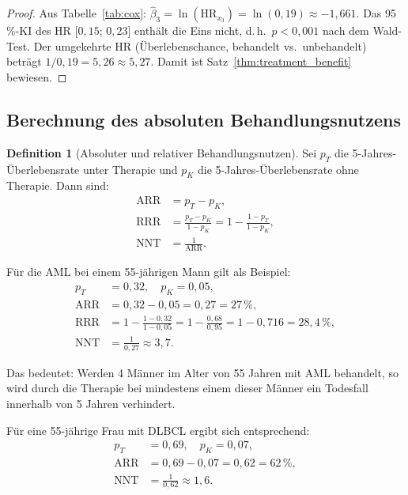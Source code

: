 ﻿\documentclass[12pt,a4paper]{article}
\theoremstyle{definition}
\newtheorem{definition}[theorem]{Definition}
\newcommand{\HR}{\mathrm{HR}}
\begin{document}
\begin{proof}
  Aus Tabelle~\ref{tab:cox}: $\hat{\beta}_3 = \ln(\HR_{x_3}) = \ln(0{,}19)
  \approx -1{,}661$.
  Das 95\,\%-KI des HR [$0{,}15$; $0{,}23$] enthält die Eins nicht, d.\,h.\
  $p < 0{,}001$ nach dem Wald-Test.
  Der umgekehrte HR (Überlebenschance, behandelt vs.\ unbehandelt) beträgt
  $1 / 0{,}19 = 5{,}26 \approx 5{,}27$.
  Damit ist Satz~\ref{thm:treatment_benefit} bewiesen.
\end{proof}

\subsection{Berechnung des absoluten Behandlungsnutzens}

\begin{definition}[Absoluter und relativer Behandlungsnutzen]
  Sei $p_T$ die 5-Jahres-Überle\-bensrate unter Therapie und $p_K$ die
  5-Jahres-Überlebensrate ohne Therapie. Dann sind:
  \begin{align}
    \mathrm{ARR} &= p_T - p_K, \label{eq:arr} \\
    \mathrm{RRR} &= \frac{p_T - p_K}{1 - p_K} = 1 - \frac{1 - p_T}{1 - p_K},
    \label{eq:rrr} \\
    \mathrm{NNT} &= \frac{1}{\mathrm{ARR}}.
    \label{eq:nnt}
  \end{align}
\end{definition}

Für die AML bei einem 55-jährigen Mann gilt als Beispiel:
\begin{align}
  p_T &= 0{,}32, \quad p_K = 0{,}05, \nonumber \\
  \mathrm{ARR} &= 0{,}32 - 0{,}05 = 0{,}27 = 27\,\%, \label{eq:arr_aml_m} \\
  \mathrm{RRR} &= 1 - \frac{1-0{,}32}{1-0{,}05} = 1 - \frac{0{,}68}{0{,}95}
               = 1 - 0{,}716 = 28{,}4\,\%, \label{eq:rrr_aml_m} \\
  \mathrm{NNT} &= \frac{1}{0{,}27} \approx 3{,}7.
  \label{eq:nnt_aml_m}
\end{align}

Das bedeutet: Werden 4 Männer im Alter von 55 Jahren mit AML behandelt, so wird
durch die Therapie bei mindestens einem dieser Männer ein Todesfall innerhalb
von 5 Jahren verhindert.

Für eine 55-jährige Frau mit DLBCL ergibt sich entsprechend:
\begin{align}
  p_T &= 0{,}69, \quad p_K = 0{,}07, \nonumber \\
  \mathrm{ARR} &= 0{,}69 - 0{,}07 = 0{,}62 = 62\,\%, \\
  \mathrm{NNT} &= \frac{1}{0{,}62} \approx 1{,}6.
  \label{eq:nnt_dlbcl_f}
\end{align}
\end{document}
